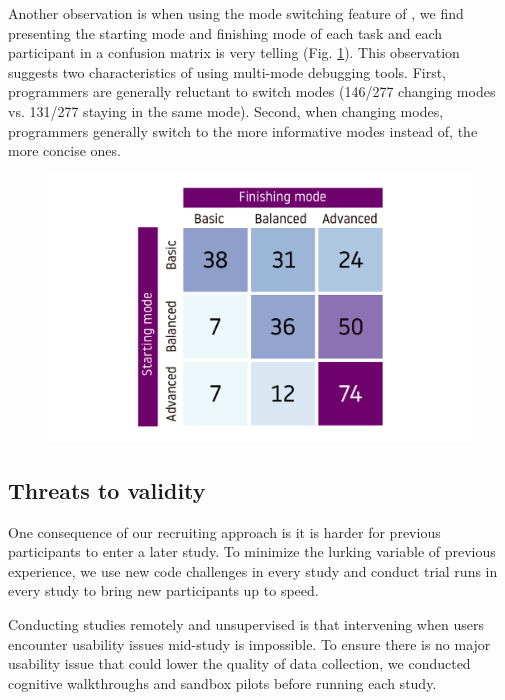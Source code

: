 Another observation is when using the mode switching feature of \chameleon{}, we find presenting the starting mode and finishing mode of each task and each participant in a confusion matrix is very telling (Fig. \ref{fig:r4-mode-switching}). 
This observation suggests two characteristics of using multi-mode debugging tools. First, programmers are generally reluctant to switch modes (146/277 changing modes vs. 131/277 staying in the same mode). Second, when changing modes, programmers generally switch to the more informative modes instead of, the more concise ones.
\begin{figure}[h]
    \centering
    \includegraphics[width=\linewidth]{images/mode-switching.pdf}
    \caption{
    }
    \label{fig:r4-mode-switching}
\end{figure}


\subsection{Threats to validity}



One consequence of our recruiting approach is it is harder for previous participants to enter a later study. To minimize the lurking variable of previous experience, we use new code challenges in every study and conduct trial runs in every study to bring new participants up to speed.

Conducting studies remotely and unsupervised is that intervening when users encounter usability issues mid-study is impossible. To ensure there is no major usability issue that could lower the quality of data collection, we conducted cognitive walkthroughs and sandbox pilots before running each study.